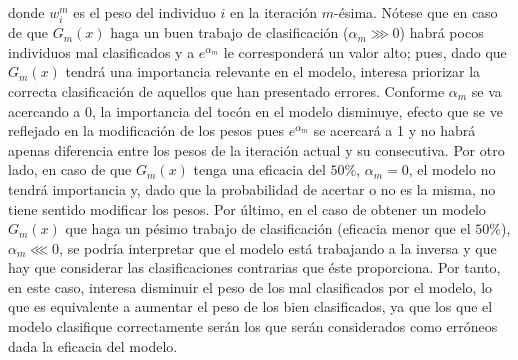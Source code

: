 \documentclass[12pt,twoside]{article}
\begin{document}
\noindent
donde $w_i^m$ es el peso del individuo $i$ en la iteración $m$-ésima. Nótese que en caso de que $G_m(x)$ haga un buen trabajo de clasificación ($\alpha_m \ggg 0$) habrá pocos individuos mal clasificados y a $e^{\alpha_m}$ le corresponderá un valor alto; pues, dado que $G_m(x)$ tendrá una importancia relevante en el modelo, interesa priorizar la correcta clasificación de aquellos que han presentado errores. Conforme $\alpha_m$ se va acercando a 0, la importancia del tocón en el modelo disminuye, efecto que se ve reflejado en la modificación de los pesos pues $e^{\alpha_m}$ se acercará a 1 y no habrá apenas diferencia entre los pesos de la iteración actual y su consecutiva. Por otro lado, en caso de que $G_m(x)$ tenga una eficacia del $50\%$, $\alpha_m = 0$, el modelo no tendrá importancia y, dado que la probabilidad de acertar o no es la misma, no tiene sentido modificar los pesos. Por último, en el caso de obtener un modelo $G_m(x)$ que haga un pésimo trabajo de clasificación (eficacia menor que el $50\%$), $\alpha_m \lll 0$, se podría interpretar que el modelo está trabajando a la inversa y que hay que considerar las clasificaciones contrarias que éste proporciona. Por tanto, en este caso, interesa disminuir el peso de los mal clasificados por el modelo, lo que es equivalente a aumentar el peso de los bien clasificados, ya que los que el modelo clasifique correctamente serán los que serán considerados como erróneos dada la eficacia del modelo.
\end{document}
